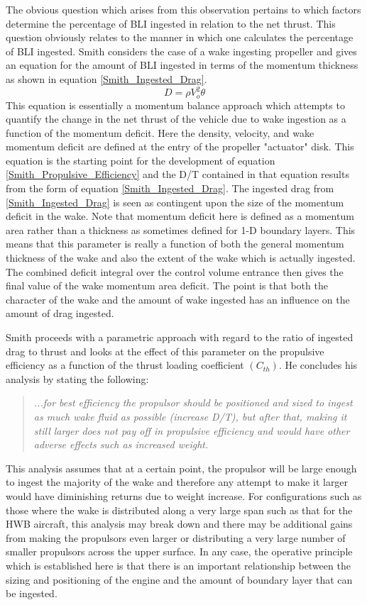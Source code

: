 \documentclass[12pt]{gatech-thesis}
\begin{document}
The obvious question which arises from this observation pertains to which factors determine the percentage of BLI ingested in relation to the net thrust.  This question obviously relates to the manner in which one calculates the percentage of BLI ingested.  
Smith \cite{Smith1993} considers the case of a wake ingesting propeller and gives an equation for the amount of BLI ingested in terms of the momentum thickness as shown in equation \ref{Smith_Ingested_Drag}.
   \begin{equation}D = \rho V_o^2 \theta \label{Smith_Ingested_Drag}\end{equation}%
This equation is essentially a momentum balance approach which attempts to quantify the change in the net thrust of the vehicle due to wake ingestion as a function of the momentum deficit.  Here the density, velocity, and wake momentum deficit are defined at the entry of the propeller "actuator" disk.  This equation is the starting point for the development of equation \ref{Smith_Propulsive_Efficiency} and the D/T contained in that equation results from the form of equation \ref{Smith_Ingested_Drag}.  The ingested drag from \ref{Smith_Ingested_Drag} is seen as contingent upon the size of the momentum deficit in the wake.  Note that momentum deficit here is defined as a momentum area rather than a thickness as sometimes defined for 1-D boundary layers.  This means that this parameter is really a function of both the general momentum thickness of the wake and also the extent of the wake which is actually ingested.  The combined deficit integral over the control volume entrance then gives the final value of the wake momentum area deficit.  The point is that both the character of the wake and the amount of wake ingested has an influence on the amount of drag ingested.

Smith proceeds with a parametric approach with regard to the ratio of ingested drag to thrust and looks at the effect of this parameter on the propulsive efficiency as a function of the thrust loading coefficient $(C_{th})$.  He concludes his analysis by stating the following:  
\begin{quote}
 \textit{...for best efficiency the propulsor should be positioned and sized to ingest as much wake fluid as possible (increase D/T), but after that, making it still larger does not pay off in propulsive efficiency and would have other adverse effects such as increased weight.}
\end{quote}
This analysis assumes that at a certain point, the propulsor will be large enough to ingest the majority of the wake and therefore any attempt to make it larger would have diminishing returns due to weight increase.  For configurations such as those where the wake is distributed along a very large span such as that for the HWB aircraft, this analysis may break down and there may be additional gains from making the propulsors even larger or distributing a very large number of smaller propulsors across the upper surface.  In any case, the operative principle which is established here is that there is an important relationship between the sizing and positioning of the engine and the amount of boundary layer that can be ingested.  
\end{document}
